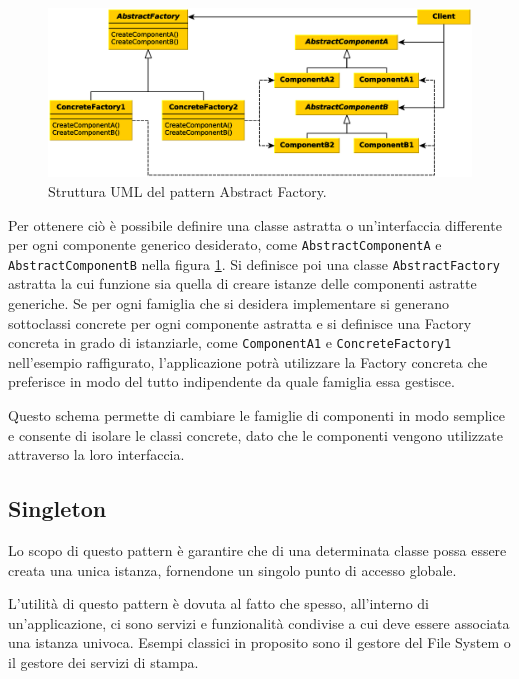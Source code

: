 \begin{figure}
\begin{center}
\includegraphics[width=13cm]{Immagini/AbstractFactoryPattern}
\caption{Struttura UML del pattern Abstract Factory.\label{f:abstractfactorypattern}} 
\end{center} 
\end{figure}

Per ottenere ci\`o \`e possibile definire una classe astratta o un'interfaccia differente per ogni componente generico desiderato, come \texttt{AbstractComponentA} e \texttt{AbstractComponentB} nella figura \ref{f:abstractfactorypattern}.
Si definisce poi una classe \texttt{AbstractFactory} astratta la cui funzione sia quella di creare istanze delle componenti astratte generiche. Se per ogni famiglia che si desidera implementare si generano sottoclassi concrete per ogni componente astratta e si definisce una Factory concreta in grado di istanziarle, come \texttt{ComponentA1} e \texttt{ConcreteFactory1} nell'esempio raffigurato, l'applicazione potr\`a utilizzare la Factory concreta che preferisce in modo del tutto indipendente da quale famiglia essa gestisce.

Questo schema permette di cambiare le famiglie di componenti in modo semplice e consente di isolare le classi concrete, dato che le componenti vengono utilizzate attraverso la loro interfaccia.

\subsection{Singleton}
\label{sub:singleton}
Lo scopo di questo pattern \`e garantire che di una determinata classe possa essere creata una unica istanza, fornendone un singolo punto di accesso globale.

L'utilit\`a di questo pattern \`e dovuta al fatto che spesso, all'interno di un'applicazione, ci sono servizi e funzionalit\`a condivise a cui deve essere associata una istanza univoca. Esempi classici in proposito sono il gestore del File System o il gestore dei servizi di stampa.

